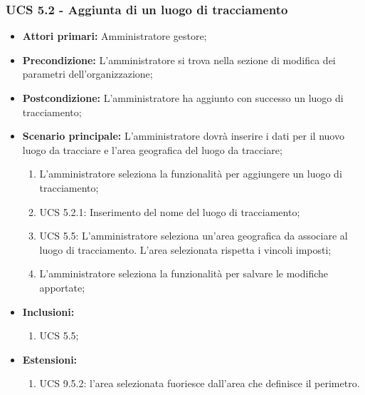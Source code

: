 \subsubsection{UCS 5.2 - Aggiunta di un luogo di tracciamento}%
\begin{itemize}
    \item \textbf{Attori primari:} Amministratore gestore;
    \item \textbf{Precondizione:} L'amministratore si trova nella sezione di modifica dei parametri dell'organizzazione;
    \item \textbf{Postcondizione:} L'amministratore ha aggiunto con successo un luogo di tracciamento;
    \item \textbf{Scenario principale:} L'amministratore dovrà inserire i dati per il nuovo luogo da tracciare e l'area geografica del luogo da tracciare;
    \begin{enumerate}%
        \item L'amministratore seleziona la funzionalità per aggiungere un luogo di tracciamento;
        \item UCS 5.2.1: Inserimento del nome del luogo di tracciamento;
        \item UCS 5.5: L'amministratore seleziona un'area geografica da associare al luogo di tracciamento. L'area selezionata rispetta i vincoli imposti;
        \item L'amministratore seleziona la funzionalità per salvare le modifiche apportate;
    \end{enumerate} 
    \item \textbf{Inclusioni:}
    \begin{enumerate}
        \item UCS 5.5;
    \end{enumerate}
    \item \textbf{Estensioni:}
    \begin{enumerate}
        \item UCS 9.5.2: l'area selezionata fuoriesce dall'area che definisce il perimetro.
    \end{enumerate}
\end{itemize}

